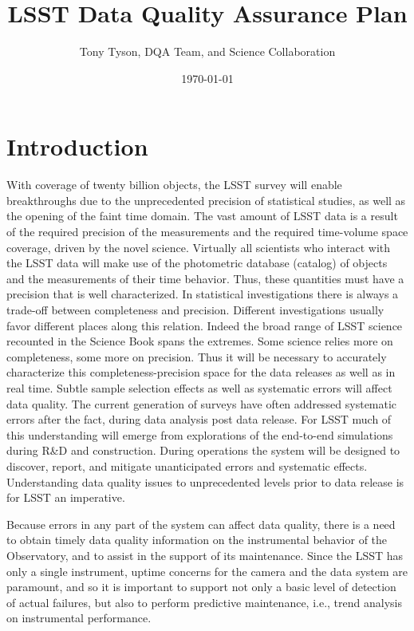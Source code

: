 \documentclass[SE,toc,lsstdraft]{lsstdoc}
\title{LSST Data Quality Assurance Plan}
\author{Tony Tyson, DQA Team, and Science Collaboration}
\date{\today}
\begin{document}
\maketitle

\section{Introduction}

With coverage of twenty billion objects, the LSST survey will enable breakthroughs due to the unprecedented precision of statistical studies, as well as the opening of the faint time domain. The vast amount of LSST data is a result of the required precision of the measurements and the required time-volume space coverage, driven by the novel science. Virtually all scientists who interact with the LSST data will make use of the photometric database (catalog) of objects and the measurements of their time behavior. Thus, these quantities must have a precision that is well characterized.  In statistical investigations there is always a trade-off between completeness and precision. Different investigations usually favor different places along this relation.  Indeed the broad range of LSST science recounted in the Science Book \citep{2009arXiv0912.0201L} spans the extremes. Some science relies more on completeness, some more on precision. Thus it will be necessary to accurately characterize this completeness-precision space for the data releases as well as in real time. Subtle sample selection effects as well as systematic errors will affect data quality. The current generation of surveys have often addressed systematic errors after the fact, during data analysis post data release. For LSST much of this understanding will emerge from explorations of the end-to-end simulations during R\&D and construction.  During operations the system will be designed to discover, report, and mitigate unanticipated errors and systematic effects.  Understanding data quality issues to unprecedented levels prior to data release is for LSST an imperative.

Because errors in any part of the system can affect data quality, there is a need to obtain timely data quality information on the instrumental behavior of the Observatory, and to assist in the support of its maintenance. Since the LSST has only a single instrument, uptime concerns for the camera and the data system are paramount, and so it is important to support not only a basic level of detection of actual failures, but also to perform predictive maintenance, i.e., trend analysis on instrumental performance.
\end{document}
